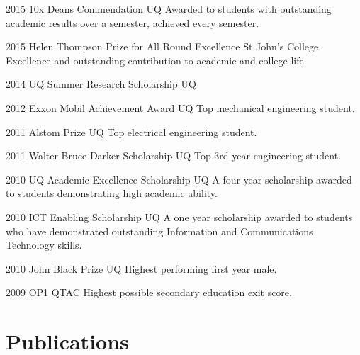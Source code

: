 \documentclass[]{friggeri-cv} %
\begin{document}
\begin{entrylist}
\entryInlineSmall
{2015}
{10x Deans Commendation}
{UQ}
{Awarded to students with outstanding academic results over a semester, achieved every semester.}
\end{entrylist}
\begin{entrylist}
\entryInlineSmall
{2015}
{Helen Thompson Prize for All Round Excellence}
{St John's College}
{Excellence and outstanding contribution to academic and college life.}
\end{entrylist}
\begin{entrylist}
\entryInlineSmall
{2014}
{UQ Summer Research Scholarship}
{UQ}
{}
\end{entrylist}
\begin{entrylist}
\entryInline
{2012}
{Exxon Mobil Achievement Award}
{UQ}
{Top mechanical engineering student.}
\end{entrylist}
\begin{entrylist}
\entryInline
{2011}
{Alstom Prize}
{UQ}
{Top electrical engineering student.}
\end{entrylist}
\begin{entrylist}
\entryInline
{2011}
{Walter Bruce Darker Scholarship}
{UQ}
{Top 3rd year engineering student.}
\end{entrylist}
\begin{entrylist}
\entryInlineSmall
{2010}
{UQ Academic Excellence Scholarship}
{UQ}
{A four year scholarship awarded to students demonstrating high academic ability.}
\end{entrylist}
\begin{entrylist}
\entryInlineSmall
{2010}
{ICT Enabling Scholarship}
{UQ}
{A one year scholarship awarded to students who have demonstrated outstanding Information and Communications Technology skills.}
\end{entrylist}
\begin{entrylist}
\entryInline
{2010}
{John Black Prize}
{UQ}
{Highest performing first year male.}
\end{entrylist}
\begin{entrylist}
\entryInline
{2009}
{OP1}
{QTAC}
{Highest possible secondary education exit score.}
\end{entrylist}


\section{Publications}
\end{document}
